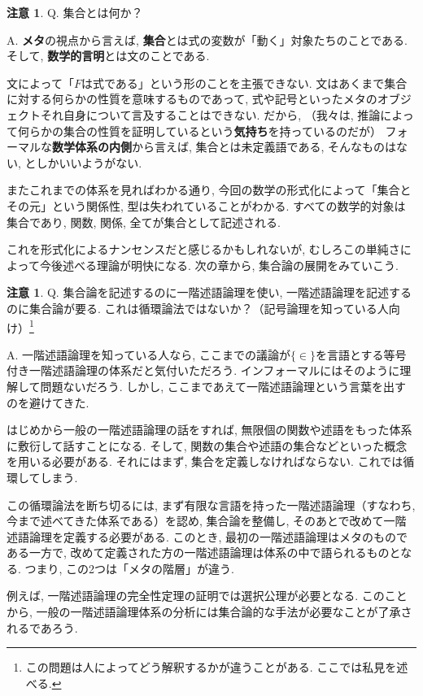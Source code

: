 \documentclass[a4paper, twoside]{bxjsarticle}
\theoremstyle{definition}
\newtheorem{rem}[thm]{注意}
\begin{document}
        \begin{rem}
            Q. 集合とは何か？
            
            A. \textbf{メタ}の視点から言えば, \textbf{集合}とは式の変数が「動く」対象たちのことである. そして, \textbf{数学的言明}とは文のことである.
            
            文によって「$F$は式である」という形のことを主張できない. 文はあくまで集合に対する何らかの性質を意味するものであって, 式や記号といったメタのオブジェクトそれ自身について言及することはできない. だから, （我々は, 推論によって何らかの集合の性質を証明しているという\textbf{気持ち}を持っているのだが） フォーマルな\textbf{数学体系の内側}から言えば, 集合とは未定義語である, そんなものはない, としかいいようがない. 
        
            またこれまでの体系を見ればわかる通り, 今回の数学の形式化によって「集合とその元」という関係性, 型は失われていることがわかる. すべての数学的対象は集合であり, 関数, 関係, 全てが集合として記述される.
            
            これを形式化によるナンセンスだと感じるかもしれないが, むしろこの単純さによって今後述べる理論が明快になる. 次の章から, 集合論の展開をみていこう.
        \end{rem}
        \begin{rem}
            Q. 集合論を記述するのに一階述語論理を使い, 一階述語論理を記述するのに集合論が要る. これは循環論法ではないか？（記号論理を知っている人向け）\footnote{この問題は人によってどう解釈するかが違うことがある. ここでは私見を述べる. }
            
            A. 一階述語論理を知っている人なら, ここまでの議論が$\{ \in \}$を言語とする等号付き一階述語論理の体系だと気付いただろう. インフォーマルにはそのように理解して問題ないだろう. しかし, ここまであえて一階述語論理という言葉を出すのを避けてきた. 
            
            はじめから一般の一階述語論理の話をすれば, 無限個の関数や述語をもった体系に敷衍して話すことになる. そして, 関数の集合や述語の集合などといった概念を用いる必要がある. それにはまず, 集合を定義しなければならない. これでは循環してしまう.
            
            この循環論法を断ち切るには, まず有限な言語を持った一階述語論理（すなわち, 今まで述べてきた体系である）を認め, 集合論を整備し, そのあとで改めて一階述語論理を定義する必要がある. このとき, 最初の一階述語論理はメタのものである一方で, 改めて定義された方の一階述語論理は体系の中で語られるものとなる. つまり, この2つは「メタの階層」が違う.
            
            例えば, 一階述語論理の完全性定理の証明では選択公理が必要となる. このことから, 一般の一階述語論理体系の分析には集合論的な手法が必要なことが了承されるであろう.
        \end{rem}
\end{document}
